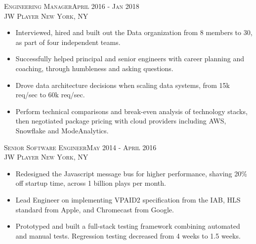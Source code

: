 \textsc{Engineering Manager\hfill April 2016 - Jan 2018\\}
\textsc{JW Player \hfill New York, NY\\}
\begin{itemize}
	\setlength{\itemsep}{1pt}
	\setlength{\parskip}{0pt}
	\setlength{\parsep}{0pt}
	\setlength{\leftmargin}{-5mm}
	\item Interviewed, hired and built out the Data organization from 8 members to 30, as part of four independent teams.
	\item Successfully helped principal and senior engineers with career planning and coaching, through humbleness and asking questions.
	\item Drove data architecture decisions when scaling data systems, from 15k req/sec to 60k req/sec.
	\item Perform technical comparisons and break-even analysis of technology stacks, then negotiated package pricing with cloud providers including AWS, Snowflake and ModeAnalytics.
\end{itemize}


\textsc{Senior Software Engineer\hfill May 2014 - April 2016\\}
\textsc{JW Player \hfill New York, NY\\}
\begin{itemize}
	\setlength{\itemsep}{1pt}
	\setlength{\itemsep}{1pt}
	\setlength{\parskip}{0pt}
	\setlength{\parsep}{0pt}
	\setlength{\leftmargin}{-5mm}
  \item Redesigned the Javascript message bus for higher performance, shaving 20\% off startup time, across 1 billion plays per month.
  \item Lead Engineer on implementing VPAID2 specification from the IAB, HLS standard from Apple, and Chromecast from Google.
  \item Prototyped and built a full-stack testing framework combining automated and manual tests. Regression testing decreased from 4 weeks to 1.5 weeks.
\end{itemize}


